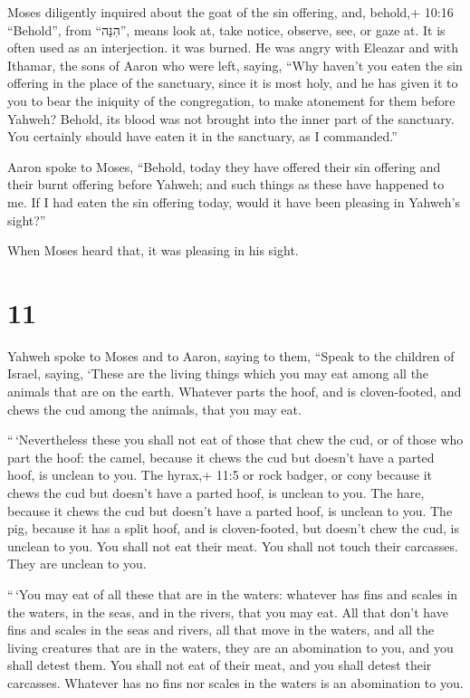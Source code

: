  Moses diligently inquired about the goat of the sin
offering, and, behold,+ 10:16 ``Behold'', from ``הִנֵּה'', means look
at, take notice, observe, see, or gaze at. It is often used as an
interjection. it was burned. He was angry with Eleazar and with Ithamar,
the sons of Aaron who were left, saying,  ``Why haven't you
eaten the sin offering in the place of the sanctuary, since it is most
holy, and he has given it to you to bear the iniquity of the
congregation, to make atonement for them before Yahweh? 
Behold, its blood was not brought into the inner part of the sanctuary.
You certainly should have eaten it in the sanctuary, as I commanded.''

 Aaron spoke to Moses, ``Behold, today they have offered
their sin offering and their burnt offering before Yahweh; and such
things as these have happened to me. If I had eaten the sin offering
today, would it have been pleasing in Yahweh's sight?''

 When Moses heard that, it was pleasing in his sight.

\hypertarget{section-10}{%
\section{11}\label{section-10}}

 Yahweh spoke to Moses and to Aaron, saying to them,
 ``Speak to the children of Israel, saying, `These are the
living things which you may eat among all the animals that are on the
earth.  Whatever parts the hoof, and is cloven-footed, and
chews the cud among the animals, that you may eat.

 ``\,`Nevertheless these you shall not eat of those that
chew the cud, or of those who part the hoof: the camel, because it chews
the cud but doesn't have a parted hoof, is unclean to you. 
The hyrax,+ 11:5 or rock badger, or cony because it chews the cud but
doesn't have a parted hoof, is unclean to you.  The hare,
because it chews the cud but doesn't have a parted hoof, is unclean to
you.  The pig, because it has a split hoof, and is
cloven-footed, but doesn't chew the cud, is unclean to you. 
You shall not eat their meat. You shall not touch their carcasses. They
are unclean to you.

 ``\,`You may eat of all these that are in the waters:
whatever has fins and scales in the waters, in the seas, and in the
rivers, that you may eat.  All that don't have fins and
scales in the seas and rivers, all that move in the waters, and all the
living creatures that are in the waters, they are an abomination to you,
 and you shall detest them. You shall not eat of their
meat, and you shall detest their carcasses.  Whatever has
no fins nor scales in the waters is an abomination to you.

